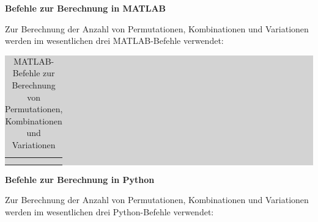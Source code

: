 {\selectfont
\noindent\textbf{Befehle zur Berechnung in MATLAB}} \smallskip

\noindent Zur Berechnung der Anzahl von Permutationen, Kombinationen und Variationen werden im wesentlichen drei MATLAB-Befehle verwendet:

\begin{table}[H]
\setlength{\arrayrulewidth}{.1em}
\caption{MATLAB-Befehle zur Berechnung von Permutationen, Kombinationen und Variationen}
\setlength{\fboxsep}{0pt}%
\colorbox{lightgray}{%
%
\begin{tabular}{| c | c | c |}
\hline

\parbox[c][0.35in][c]{2.18in}{} &
\parbox[c][0.35in][c]{2.18in}{}&
\parbox[c][0.35in][c]{2.18in}{}\\ \hline

\parbox[c][0.35in][c]{2.18in}{} &
\parbox[c][0.35in][c]{2.18in}{}&
\parbox[c][0.35in][c]{2.18in}{}\\ \hline

\parbox[c][0.5in][c]{2.18in}{} &
\parbox[c][0.5in][c]{2.18in}{}&
\parbox[c][0.5in][c]{2.18in}{}\\ \hline

\end{tabular}%
}
\label{tab:twothree}
\end{table}

{\selectfont
\noindent\textbf{Befehle zur Berechnung in Python}} \smallskip

\noindent Zur Berechnung der Anzahl von Permutationen, Kombinationen und Variationen werden im wesentlichen drei Python-Befehle verwendet:


